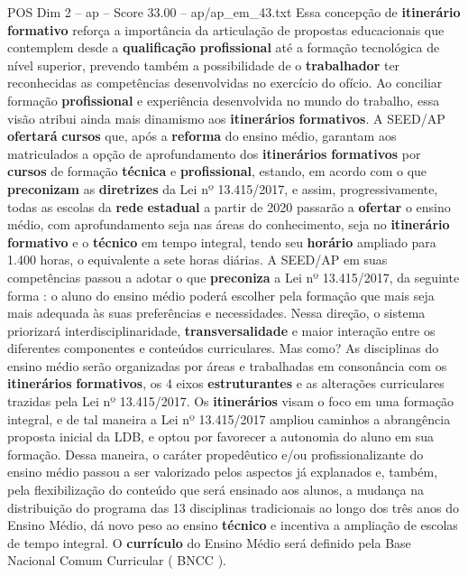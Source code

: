 \begin{textsample}{POS Dim 2 – ap – Score 33.00 – ap/ap\_em\_43.txt}
Essa concepção de \textbf{itinerário} \textbf{formativo} reforça a importância da articulação de propostas educacionais que contemplem desde a \textbf{qualificação} \textbf{profissional} até a formação tecnológica de nível superior, prevendo também a possibilidade de o \textbf{trabalhador} ter reconhecidas as competências desenvolvidas no exercício do ofício.
Ao conciliar formação \textbf{profissional} e experiência desenvolvida no mundo do trabalho, essa visão atribui ainda mais dinamismo aos \textbf{itinerários} \textbf{formativos}.
A SEED/AP \textbf{ofertará} \textbf{cursos} que, após a \textbf{reforma} do ensino médio, garantam aos matriculados a opção de aprofundamento dos \textbf{itinerários} \textbf{formativos} por \textbf{cursos} de formação \textbf{técnica} e \textbf{profissional}, estando, em acordo com o que \textbf{preconizam} as \textbf{diretrizes} da Lei nº 13.415/2017, e assim, progressivamente, todas as escolas da \textbf{rede} \textbf{estadual} a partir de 2020 passarão a \textbf{ofertar} o ensino médio, com aprofundamento seja nas áreas do conhecimento, seja no \textbf{itinerário} \textbf{formativo} e o \textbf{técnico} em tempo integral, tendo seu \textbf{horário} ampliado para 1.400 horas, o equivalente a sete horas diárias.
A SEED/AP em suas competências passou a adotar o que \textbf{preconiza} a Lei nº 13.415/2017, da seguinte forma : o aluno do ensino médio poderá escolher pela formação que mais seja mais adequada às suas preferências e necessidades.
Nessa direção, o sistema priorizará interdisciplinaridade, \textbf{transversalidade} e maior interação entre os diferentes componentes e conteúdos curriculares.
Mas como?
As disciplinas do ensino médio serão organizadas por áreas e trabalhadas em consonância com os \textbf{itinerários} \textbf{formativos}, os 4 eixos \textbf{estruturantes} e as alterações curriculares trazidas pela Lei nº 13.415/2017.
Os \textbf{itinerários} visam o foco em uma formação integral, e de tal maneira a Lei nº 13.415/2017 ampliou caminhos a abrangência proposta inicial da LDB, e optou por favorecer a autonomia do aluno em sua formação.
Dessa maneira, o caráter propedêutico e/ou profissionalizante do ensino médio passou a ser valorizado pelos aspectos já explanados e, também, pela flexibilização do conteúdo que será ensinado aos alunos, a mudança na distribuição do programa das 13 disciplinas tradicionais ao longo dos três anos do Ensino Médio, dá novo peso ao ensino \textbf{técnico} e incentiva a ampliação de escolas de tempo integral.
O \textbf{currículo} do Ensino Médio será definido pela Base Nacional Comum Curricular ( BNCC ).

\end{textsample}
